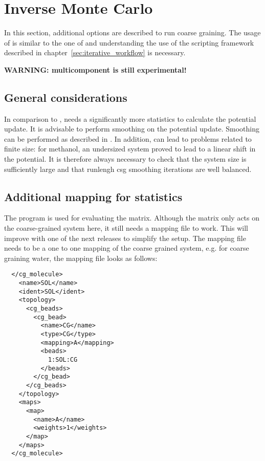 \chapter{Inverse Monte Carlo}
In this section, additional options are described to run \imc coarse graining. The usage of \imc is similar to the one of \ibi and understanding the use of the scripting framework described in chapter~\ref{sec:iterative_workflow} is necessary.

\textbf{WARNING: multicomponent \imc is still experimental!}

\section{General considerations}
In comparison to \ibi, \imc needs a significantly more statistics to calculate the potential update\cite{Ruehle:2009.a}. It is advisable to perform smoothing on the potential update. Smoothing can be performed as described in . In addition, \imc can lead to problems related to finite size: for methanol, an undersized system proved to lead to a linear shift in the potential\cite{Ruehle:2009.a}. It is therefore always necessary to check that the system size is sufficiently large and that runlengh csg smoothing iterations are well balanced.

\section{Additional mapping for statistics}
The program  is used for evaluating the \imc matrix. Although the matrix only acts on the coarse-grained system here, it still needs a mapping file to work. This will improve with one of the next releases to simplify the setup. The mapping file needs to be a one to one mapping of the coarse grained system, e.g. for coarse graining \spce water, the mapping file looks as follows:
\begin{lstlisting}
  </cg_molecule>
    <name>SOL</name> 
    <ident>SOL</ident>
    <topology>
      <cg_beads>
        <cg_bead>
          <name>CG</name>
          <type>CG</type>
          <mapping>A</mapping>
          <beads>
            1:SOL:CG 
          </beads>
        </cg_bead>
      </cg_beads>
    </topology>
    <maps>
      <map>
        <name>A</name>
        <weights>1</weights>
      </map>
    </maps>
  </cg_molecule>
\end{lstlisting}



